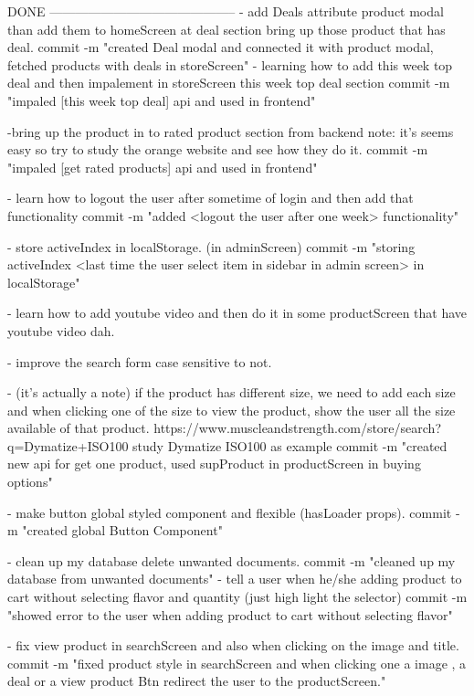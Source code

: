 
DONE
--------------------------------------------
- add Deals attribute product modal than add them to homeScreen 
       at deal section bring up those product that has deal.
       commit -m "created Deal modal and connected it with product modal, fetched products with deals in 
       storeScreen"
- learning how to add this week top deal and then impalement in storeScreen this week top deal section
      commit -m "impaled [this week top deal] api and used in frontend"

-bring up the product in to rated product section from backend 
      note: it's seems easy so try to study the orange website and see how they do it.
      commit -m "impaled [get rated products] api and used in frontend"

-   learn how to logout the user after sometime of login and 
            then add that functionality
      commit -m "added <logout the user after one week> functionality"

- store activeIndex in localStorage. (in adminScreen)
      commit -m "storing activeIndex <last time the user select item in sidebar in admin screen> in localStorage"

- learn how to add youtube video and then do it in some 
      productScreen that have youtube video dah.

- improve the search form case sensitive to not.

-  (it's actually a note) if the product has different size, 
      we need to add each size and when
      clicking one of the size to view the product, show the 
      user all the size available of that product.
      https://www.muscleandstrength.com/store/search?q=Dymatize+ISO100
      study Dymatize ISO100 as example
      commit -m "created new api for get one product, used supProduct in productScreen in buying options"

-   make button global styled component and flexible 
      (hasLoader props).
      commit -m "created global Button Component"

- clean up my database delete unwanted documents.
      commit -m "cleaned up my database from unwanted documents"
-  tell a user when he/she adding product to cart without 
selecting flavor and quantity (just high light the selector)
      commit -m "showed error to the user when adding product to cart without selecting flavor"

-   fix view product in searchScreen and also when clicking on the image and title.
      commit -m "fixed product style in searchScreen and when clicking one a image , a deal or a view product Btn redirect the user to the productScreen."

